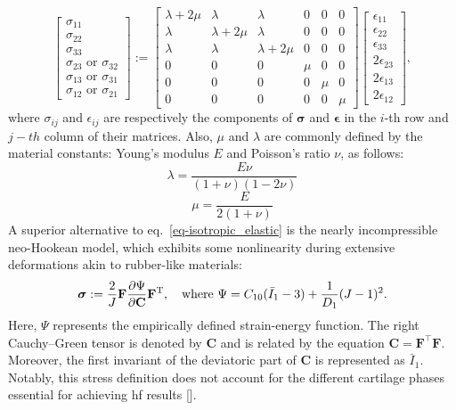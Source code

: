 \begin{equation}
\begin{bmatrix}
\sigma_{11} \\
\sigma_{22} \\
\sigma_{33} \\
\sigma_{23} \text{ or } \sigma_{32} \\
\sigma_{13} \text{ or } \sigma_{31} \\
\sigma_{12} \text{ or } \sigma_{21}
\end{bmatrix}
:=
\begin{bmatrix}
\lambda + 2\mu & \lambda & \lambda & 0 & 0 & 0 \\
\lambda & \lambda + 2\mu & \lambda & 0 & 0 & 0 \\
\lambda & \lambda & \lambda + 2\mu & 0 & 0 & 0 \\
0 & 0 & 0 & \mu & 0 & 0 \\
0 & 0 & 0 & 0 & \mu & 0 \\
0 & 0 & 0 & 0 & 0 & \mu
\end{bmatrix}
%
\begin{bmatrix}
\epsilon_{11} \\
\epsilon_{22} \\
\epsilon_{33} \\
2\epsilon_{23} \\
2\epsilon_{13} \\
2\epsilon_{12}
\end{bmatrix},
%
\end{equation}
%
where $\sigma_{ij}$ and $\epsilon_{ij}$ are respectively the components of $\bm{\sigma}$ and $\bm{\epsilon}$ in the $i$-th row and $j-th$ column of their matrices. Also, $\mu$ and $\lambda$ are commonly defined by the material constants: Young's modulus $E$ and Poisson's ratio $\nu$, as follows:
%
\begin{equation}
\lambda = \frac{E \nu}{(1+\nu)(1-2\nu)}
\end{equation}
%
\begin{equation}
\mu = \frac{E}{2(1+\nu)}
\end{equation}
%
A superior alternative to eq.~\ref{eq-isotropic_elastic} is the nearly incompressible neo-Hookean model, which exhibits some nonlinearity during extensive deformations akin to rubber-like materials:
%
\begin{equation}\label{eq-hyperelastic}
\bm{\sigma} :=\frac{2}{J}
\mathbf{F}\frac{\partial\Psi}{\partial\mathbf{C}}\mathbf{F}^{\rm T},
\quad \text{where }
\Psi = C_{10}(\bar{I}_1 - 3) + \frac{1}{D_1}(J - 1)^2.
\end{equation}
%
Here, $\Psi$ represents the empirically defined strain-energy function. The right Cauchy–Green tensor is denoted by \( \mathbf{C} \) and is related by the equation \( \mathbf{C} = \mathbf{F}^{\top} \mathbf{F} \). Moreover, the first invariant of the deviatoric part of \( \mathbf{C} \) is represented as \( \bar{I}_1 \). Notably, this stress definition does not account for the different cartilage phases essential for achieving \ac{hf} results [\cite{gerhard-book}].

